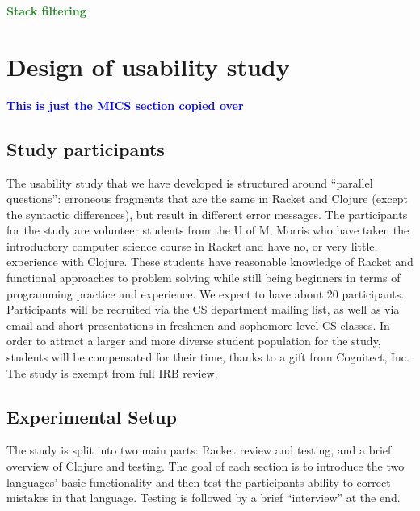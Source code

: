 \documentclass[submission,copyright,creativecommons]{eptcs}
\newcommand{\allcomments}[1]{{#1}}
\newcommand{\emcomment}[1]{{\bf \textcolor{ForestGreen}{\allcomments{{#1}}}}}
\newcommand{\thcomment}[1]{{\bf \textcolor{blue}{\allcomments{{#1}}}}}
\begin{document}
\emcomment{Stack filtering}

\section{Design of usability study}\label{sec:study}
	\thcomment{This is just the MICS section copied over}
	
	\subsection{Study participants}\label{sec:obj}
The usability study that we have developed is structured around ``parallel questions'': erroneous fragments that are the same in 
Racket and Clojure (except the syntactic differences), but result in different error messages.  
The participants for the study are volunteer students from the U of M, Morris who have taken the introductory computer science course in Racket and have no, or very little, experience with Clojure.
These students have reasonable knowledge of Racket and functional approaches to problem solving while still being beginners in terms of programming practice and experience.
We expect to have about 20 participants. 
Participants will be recruited via the CS department mailing list, as well as via email and short presentations in freshmen and sophomore level CS classes. 
In order to attract a larger and more diverse student population for the study, students will be compensated for their time, thanks to a gift from Cognitect, Inc. 
The study is exempt from full IRB review. 

	\subsection{Experimental Setup}\label{sec:setup}
	
	   
The study is split into two main parts: Racket review and testing, and a brief overview of Clojure and testing.
The goal of each section is to introduce the two languages' basic functionality and then test the participants ability to correct mistakes in that language.
 Testing is followed by a brief ``interview'' at the end. 
\end{document}

